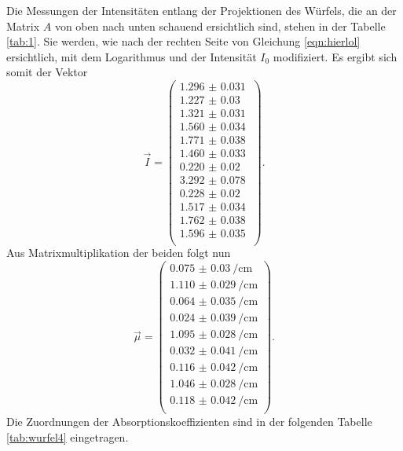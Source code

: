 Die Messungen der Intensitäten entlang der Projektionen des Würfels, die an der Matrix $A$ von oben nach unten schauend ersichtlich sind, stehen in der Tabelle \ref{tab:1}. 
Sie werden, wie nach der rechten Seite von Gleichung \eqref{eqn:hierlol} ersichtlich, mit dem Logarithmus und der Intensität $I_0$ modifiziert. Es ergibt sich somit der Vektor
\begin{equation*}
\vec{I} = 
\begin{pmatrix}
    \SI{1.296(31)}{} \\ 
    \SI{1.227(30)}{} \\ 
    \SI{1.321(31)}{} \\ 
    \SI{1.560(34)}{} \\ 
    \SI{1.771(38)}{} \\ 
    \SI{1.460(33)}{} \\ 
    \SI{0.220(20)}{} \\ 
    \SI{3.292(78)}{} \\ 
    \SI{0.228(20)}{} \\ 
    \SI{1.517(34)}{} \\ 
    \SI{1.762(38)}{} \\ 
    \SI{1.596(35)}{} \\ 
\end{pmatrix}.
\end{equation*}
Aus Matrixmultiplikation der beiden folgt nun 
\begin{equation*}
\vec{\mu} = 
\begin{pmatrix}
    \SI{0.075(30)}{\per\centi\meter} \\ 
    \SI{1.110(29)}{\per\centi\meter} \\ 
    \SI{0.064(35)}{\per\centi\meter} \\ 
    \SI{0.024(39)}{\per\centi\meter} \\ 
    \SI{1.095(28)}{\per\centi\meter} \\ 
    \SI{0.032(41)}{\per\centi\meter} \\ 
    \SI{0.116(42)}{\per\centi\meter} \\ 
    \SI{1.046(28)}{\per\centi\meter} \\ 
    \SI{0.118(42)}{\per\centi\meter} \\ 
\end{pmatrix}.
\end{equation*}
Die Zuordnungen der Absorptionskoeffizienten sind in der folgenden Tabelle \ref{tab:wurfel4} eingetragen.
